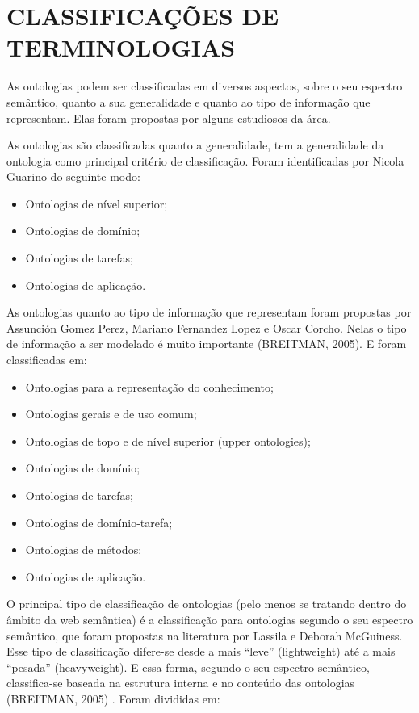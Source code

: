 \section{CLASSIFICAÇÕES DE TERMINOLOGIAS}

As ontologias podem ser classificadas em diversos aspectos, sobre o seu espectro
semântico, quanto a sua generalidade e quanto ao tipo de informação que representam.
Elas foram propostas por alguns estudiosos da área.

As ontologias são classificadas quanto a generalidade, tem a generalidade da ontologia
como principal critério de classificação. Foram identificadas por Nicola Guarino do
seguinte modo:
\begin{itemize}
  \item Ontologias de nível superior;
  \item Ontologias de domínio;
  \item Ontologias de tarefas;
  \item Ontologias de aplicação.
\end{itemize}
As ontologias quanto ao tipo de informação que representam foram propostas por
Assunción Gomez Perez, Mariano Fernandez Lopez e Oscar Corcho. Nelas o tipo de
informação a ser modelado é muito importante (BREITMAN, 2005). E foram classificadas
em:
\begin{itemize}
\item Ontologias para a representação do conhecimento;
\item Ontologias gerais e de uso comum;
\item Ontologias de topo e de nível superior (upper ontologies);
\item Ontologias de domínio;
\item Ontologias de tarefas;
\item Ontologias de domínio-tarefa;
\item Ontologias de métodos;
\item Ontologias de aplicação.
\end{itemize}

O principal tipo de classificação de ontologias (pelo menos se tratando dentro do
âmbito da web semântica) é a classificação para ontologias segundo o seu espectro
semântico, que foram propostas na literatura por Lassila e Deborah McGuiness. Esse tipo
de classificação difere-se desde a mais “leve” (lightweight) até a mais “pesada”
(heavyweight). E essa forma, segundo o seu espectro semântico, classifica-se baseada na
estrutura interna e no conteúdo das ontologias (BREITMAN, 2005) . Foram divididas em:

